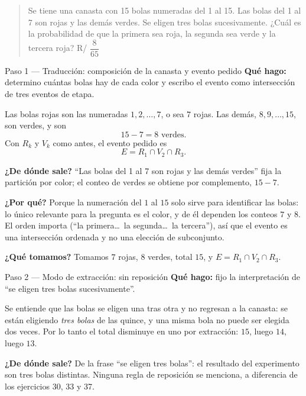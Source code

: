 \documentclass[11pt]{article}
\begin{document}
\begin{quote}
Se tiene una canasta con 15 bolas numeradas del 1 al 15. Las bolas del 1 al 7 son rojas y las dem\'as verdes. Se eligen tres bolas sucesivamente. ¿Cu\'al es la probabilidad de que la primera sea roja, la segunda sea verde y la tercera roja? \hfill R/ $\dfrac{8}{65}$
\end{quote}

\begin{sol}

\begin{paso}{Paso 1 --- Traducci\'on: composici\'on de la canasta y evento pedido}
\textbf{Qu\'e hago:} determino cu\'antas bolas hay de cada color y escribo el evento como intersecci\'on de tres eventos de etapa.

Las bolas rojas son las numeradas $1,2,\dots,7$, o sea $7$ rojas. Las dem\'as, $8,9,\dots,15$, son verdes, y son
\[
15-7=8 \text{ verdes.}
\]
Con $R_k$ y $V_k$ como antes, el evento pedido es
\[
E=R_1\cap V_2\cap R_3 .
\]

\textbf{¿De d\'onde sale?} ``Las bolas del 1 al 7 son rojas y las dem\'as verdes'' fija la partici\'on por color; el conteo de verdes se obtiene por complemento, $15-7$.

\textbf{¿Por qu\'e?} Porque la numeraci\'on del $1$ al $15$ solo sirve para identificar las bolas: lo \'unico relevante para la pregunta es el color, y de \'el dependen los conteos $7$ y $8$. El orden importa (``la primera\dots\ la segunda\dots\ la tercera''), as\'i que el evento es una intersecci\'on ordenada y no una elecci\'on de subconjunto.

\textbf{¿Qu\'e tomamos?} Tomamos $7$ rojas, $8$ verdes, total $15$, y $E=R_1\cap V_2\cap R_3$.
\end{paso}

\begin{paso}{Paso 2 --- Modo de extracci\'on: sin reposici\'on}
\textbf{Qu\'e hago:} fijo la interpretaci\'on de ``se eligen tres bolas sucesivamente''.

Se entiende que las bolas se eligen una tras otra y no regresan a la canasta: se est\'an eligiendo \emph{tres bolas} de las quince, y una misma bola no puede ser elegida dos veces. Por lo tanto el total disminuye en uno por extracci\'on: $15$, luego $14$, luego $13$.

\textbf{¿De d\'onde sale?} De la frase ``se eligen tres bolas'': el resultado del experimento son tres bolas distintas. Ninguna regla de reposici\'on se menciona, a diferencia de los ejercicios 30, 33 y 37.


\end{paso}
\end{sol}
\end{document}
